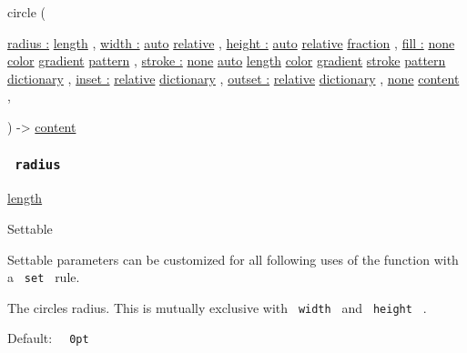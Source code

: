 { circle } (

{ \hyperref[parameters-radius]{radius :}
\href{/docs/reference/layout/length/}{length} , } {
\hyperref[parameters-width]{width :}
\href{/docs/reference/foundations/auto/}{auto}
\href{/docs/reference/layout/relative/}{relative} , } {
\hyperref[parameters-height]{height :}
\href{/docs/reference/foundations/auto/}{auto}
\href{/docs/reference/layout/relative/}{relative}
\href{/docs/reference/layout/fraction/}{fraction} , } {
\hyperref[parameters-fill]{fill :}
\href{/docs/reference/foundations/none/}{none}
\href{/docs/reference/visualize/color/}{color}
\href{/docs/reference/visualize/gradient/}{gradient}
\href{/docs/reference/visualize/pattern/}{pattern} , } {
\hyperref[parameters-stroke]{stroke :}
\href{/docs/reference/foundations/none/}{none}
\href{/docs/reference/foundations/auto/}{auto}
\href{/docs/reference/layout/length/}{length}
\href{/docs/reference/visualize/color/}{color}
\href{/docs/reference/visualize/gradient/}{gradient}
\href{/docs/reference/visualize/stroke/}{stroke}
\href{/docs/reference/visualize/pattern/}{pattern}
\href{/docs/reference/foundations/dictionary/}{dictionary} , } {
\hyperref[parameters-inset]{inset :}
\href{/docs/reference/layout/relative/}{relative}
\href{/docs/reference/foundations/dictionary/}{dictionary} , } {
\hyperref[parameters-outset]{outset :}
\href{/docs/reference/layout/relative/}{relative}
\href{/docs/reference/foundations/dictionary/}{dictionary} , } {
\hyperref[parameters-body]{}
\href{/docs/reference/foundations/none/}{none}
\href{/docs/reference/foundations/content/}{content} , }

) -\textgreater{} \href{/docs/reference/foundations/content/}{content}

\subsubsection{\texorpdfstring{\texttt{\ radius\ }}{ radius }}\label{parameters-radius}

\href{/docs/reference/layout/length/}{length}

{{ Settable }}

\label{parameters-radius-settable-tooltip}
Settable parameters can be customized for all following uses of the
function with a \texttt{\ set\ } rule.

The circle\textquotesingle s radius. This is mutually exclusive with
\texttt{\ width\ } and \texttt{\ height\ } .

Default: \texttt{\ }{\texttt{\ 0pt\ }}\texttt{\ }


